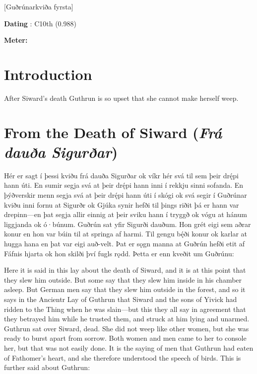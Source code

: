[Guðrúnarkviða fyrsta]
\def\thisBookCode{GudrunOne}

\begin{flushright}%
\textbf{Dating} \parencite{Sapp2022}: C10th (0.988)

\textbf{Meter:} \Fornyrdislag%
\end{flushright}

\section{Introduction}

After Siward’s death Guthrun is so upset that she cannot make herself weep.

\sectionline

\section{From the Death of Siward (\emph{Frá dauða Sigurðar})}

\bpg\bpa Hér er sagt í þessi kviðu frá dauða Sigurðar ok víkr hér svá til sem þeir drę́pi hann úti. En sumir segja svá at þeir drę́pi hann inni í rekkju sinni sofanda. En þýðverskir menn segja svá at þeir drę́pi hann úti í skógi ok svá segir í Guðrúnar kviðu inni fornu at Sigurðr ok Gjúka synir hefði til þings riðit þá er hann var drepinn—en þat segja allir einnig at þeir sviku hann í tryggð ok vógu at hánum liggjanda ok ó·búnum.
Guðrún sat yfir Sigurði dauðum. Hon grét eigi sem aðrar konur en hon var búin til at springa af harmi. Til gengu bę́ði konur ok karlar at hugga hana en þat var eigi auð-velt. Þat er sǫgn manna at Guðrún hefði etit af Fáfnis hjarta ok hon skilði því fugls rǫdd. Þetta er enn kveðit um Guðrúnu:\epa

\bpb Here it is said in this lay about the death of Siward, and it is at this point that they slew him outside. But some say that they slew him inside in his chamber asleep. But German men say that they slew him outside in the forest, and so it says in the Ancientr Lay of Guthrun that Siward and the sons of Yivick had ridden to the Thing when he was slain—but this they all say in agreement that they betrayed him while he trusted them, and struck at him lying and unarmed.
Guthrun sat over Siward, dead. She did not weep like other women, but she was ready to burst apart from sorrow. Both women and men came to her to console her, but that was not easily done. It is the saying of men that Guthrun had eaten of Fathomer’s heart, and she therefore understood the speech of birds. This is further said about Guthrun:\epb\epg

